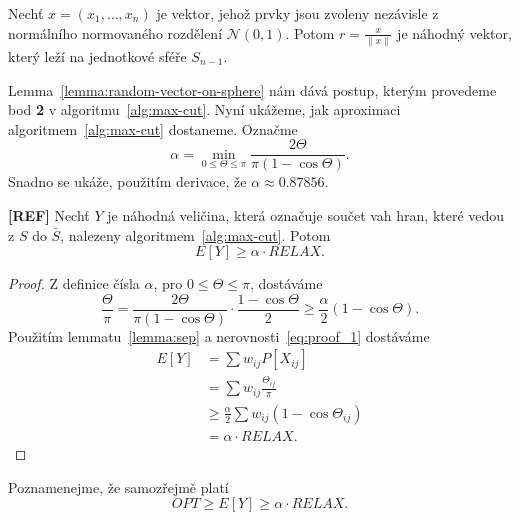 \begin{lm}[KNUTH 2, 135]
    Nechť $x = (x_1, \dots, x_n)$ je vektor, jehož prvky jsou zvoleny nezávisle z normálního normovaného rozdělení $\mathcal{N}(0,1)$. Potom $r = \frac{x}{\| x \|}$ je náhodný vektor, který leží na jednotkové sféře $S_{n-1}$.
    \label{lemma:random-vector-on-sphere}
\end{lm}

Lemma~\ref{lemma:random-vector-on-sphere} nám dává postup, kterým provedeme bod \textbf{2} v algoritmu~\ref{alg:max-cut}. Nyní ukážeme, jak  aproximaci algoritmem~\ref{alg:max-cut} dostaneme. Označme
$$
    \alpha = \min_{0 \leq \Theta \leq \pi} \frac{2 \Theta}{\pi (1 - \cos \Theta)}.
$$
Snadno se ukáže, použitím derivace, že $\alpha \approx 0.87856$.

\begin{lm}\textbf{[REF]}
    Nechť $Y$ je náhodná veličina, která označuje součet vah hran, které vedou z $S$ do $\bar{S}$, nalezeny algoritmem~\ref{alg:max-cut}. Potom
    $$
        E\left[ Y \right] \geq \alpha \cdot RELAX.
    $$
\end{lm}

\begin{proof}
    Z definice čísla $\alpha$, pro $0 \leq \Theta \leq \pi$, dostáváme
    \begin{equation}
        \frac{\Theta}{\pi} = \frac{2 \Theta}{\pi (1 - \cos \Theta)} \cdot \frac{1 - \cos \Theta}{2} \geq \frac{\alpha}{2} (1 - \cos \Theta).
        \label{eq:proof_1}
    \end{equation}
    Použitím lemmatu~\ref{lemma:sep} a nerovnosti~\ref{eq:proof_1} dostáváme
    \begin{equation*}
        \begin{split}
            E\left[ Y \right] &= \sum w_{ij} P\left[ X_{ij} \right] \\
                              &= \sum w_{ij} \frac{\Theta_{ij}}{\pi} \\
                              &\geq \frac{\alpha}{2} \sum w_{ij} (1 - \cos \Theta_{ij}) \\
                              &= \alpha \cdot RELAX.
        \end{split}
    \end{equation*}
\end{proof}

\noindent Poznamenejme, že samozřejmě platí
\begin{equation}
    OPT \geq E\left[ Y \right] \geq \alpha \cdot RELAX.
    \label{eq:int-gap}
\end{equation}

